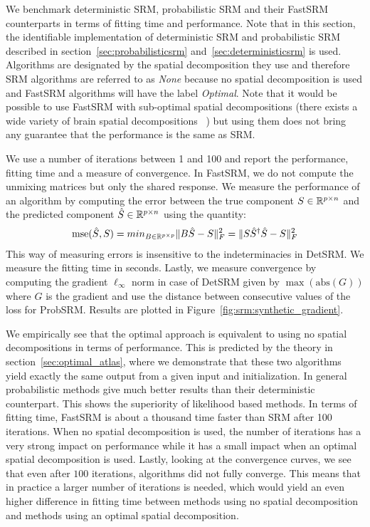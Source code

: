 \documentclass{article}
\begin{document}
We benchmark deterministic SRM, probabilistic SRM and their FastSRM counterparts in terms of fitting time and performance.
%
Note that in this section, the identifiable implementation of deterministic SRM
and probabilistic SRM described in section~\ref{sec:probabilisticsrm}
and~\ref{sec:deterministicsrm} is used. 
%
Algorithms are designated by the spatial decomposition they use and therefore SRM algorithms are referred to
as \emph{None} because no spatial decomposition is used and FastSRM algorithms will have the
label \emph{Optimal}.
%
Note that it would be possible to use FastSRM with sub-optimal
spatial decompositions (there exists a wide variety of brain spatial decompositions
~\cite{schaefer2017local, bellec2010multi, mensch2018extracting}) but
using them does not bring any guarantee that the performance is the same as SRM.
%


We use a number of iterations between 1 and 100 and report the performance,
fitting time and a measure of convergence.
%
In FastSRM, we do not compute the
unmixing matrices but only the shared response.
%
We measure the performance of an algorithm by computing the error between the true component $S \in \mathbb{R}^{p \times n}$ and
the predicted component $\hat{S} \in \mathbb{R}^{p \times n}$ using the quantity:
\begin{align}
\mathrm{mse}(\hat{S}, S) = min_{B \in \mathbb{R}^{p \times p}} \|B \hat{S} - S \|^2_F =  \|S
\hat{S}^{\dagger}\hat{S} - S \|^2_F
\end{align}
%
This way of measuring errors is
insensitive to the indeterminacies in DetSRM.
%
We measure the fitting time in seconds.
%
Lastly, we measure convergence by computing the gradient $\ell_{\infty}$ norm in
case of DetSRM given by $\max(\mathrm{abs}(G))$ where $G$ is the gradient and
use the distance between consecutive values of the loss for ProbSRM.
%
Results are plotted in Figure~\ref{fig:srm:synthetic_gradient}.
%

We empirically see that the optimal approach is equivalent to using no spatial decompositions in
terms of performance.
%
This is predicted by the theory in section~\ref{sec:optimal_atlas},
where we demonstrate that these two algorithms yield exactly the same
output from a given input and initialization.
%
%
In general probabilistic methods give much better results than their deterministic
counterpart.
%
This shows the superiority of likelihood based methods.
%
In terms of fitting time, FastSRM is about a thousand time faster than SRM after
100 iterations.
%
When no spatial decomposition is used, the number
of iterations has a very strong impact on performance while it has a small impact
when an optimal spatial decomposition is used.
%
Lastly, looking at the convergence curves, we see that even after $100$ iterations, algorithms did
not fully converge.
%
This means that in practice a larger number of
iterations is needed, which would yield an even higher difference in fitting time
between methods using no spatial decomposition and methods using an optimal
spatial decomposition.
%
\end{document}

